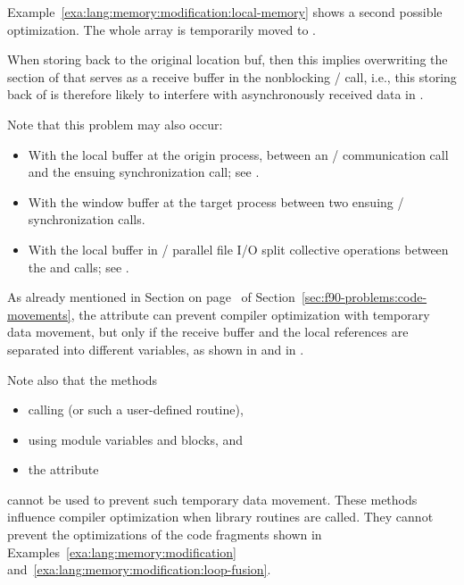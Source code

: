 Example~\ref{exa:lang:memory:modification:local-memory} shows
a second possible optimization.
The whole array is temporarily moved to .

When storing  back to the original location buf,
then this implies overwriting the section of  that serves
as a receive buffer in the nonblocking \MPI/ call, i.e., this storing
back of  is therefore likely to interfere with
asynchronously received data in .

Note that this problem may also occur:
\begin{itemize}
\item With the local buffer at the origin process,
between an \RMA/ communication call and the ensuing synchronization call;
see .
\item With the window buffer at the target process
between two ensuing \RMA/ synchronization calls.
\item With the local buffer in \MPI/ parallel file I/O split collective operations
between the  and  calls;
see .
%
%
%
%
%
%
\end{itemize}


As already mentioned in Section 
on page~\pageref{sec:f90-problems:asynchronous} of
Section~\ref{sec:f90-problems:code-movements},
the  attribute can prevent compiler optimization with temporary data movement,
but only if the receive buffer and the local references are
separated into different variables,
as shown in 
and in .

Note also that the methods
\begin{itemize}
\item calling  (or such a user-defined routine),
\item using module variables and  blocks, and
\item the  attribute
\end{itemize}
cannot be used to prevent such temporary data movement.
These methods influence compiler optimization when
library routines are called. They cannot prevent the optimizations
of the code fragments shown in
Examples~\ref{exa:lang:memory:modification}
and~\ref{exa:lang:memory:modification:loop-fusion}.

